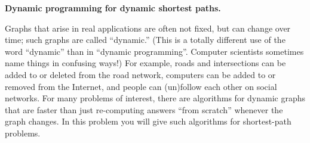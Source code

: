 \documentclass[11pt,addpoints,answers]{exam}
\begin{document}
\begin{questions}
\pagebreak
\question \textbf{Dynamic programming for dynamic shortest paths.} \nopagebreak
             
  Graphs that arise in real applications are often not fixed, but can change over time; such graphs are called ``dynamic.''
  (This is a totally different use of the word ``dynamic'' than in ``dynamic programming''.
  Computer scientists sometimes name things in confusing ways!)
  For example, roads and intersections can be added to or deleted from the road network, computers can be added to or removed from the Internet, and people can (un)follow each other on social networks.
  For many problems of interest, there are algorithms for dynamic graphs that are faster than just re-computing answers ``from scratch'' whenever the graph changes.
  In this problem you will give such algorithms for shortest-path problems.
  

\end{questions}
\end{document}
